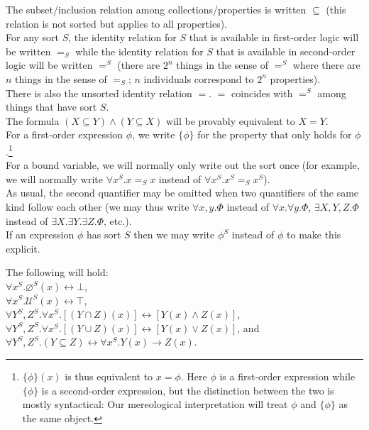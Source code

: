 \documentclass[12pt]{book}
\begin{document}
\indent * The subset/inclusion relation among collections/properties is written $\subseteq$ (this relation is not sorted but applies to all properties).\\
\indent * For any sort $S$, the identity relation for $S$ that is available in first-order logic will be written $=_S$ while the identity relation for $S$ that is available in second-order logic will be written $=^S$ (there are $2^n$ things in the sense of $=^S$ where there are $n$ things in the sense of $=_S$; $n$ individuals correspond to $2^n$ properties).\\
\indent * There is also the unsorted identity relation $=$. $=$ coincides with $=^S$ among things that have sort $S$.\\
\indent * The formula $(X \subseteq Y) \wedge (Y \subseteq X)$ will be provably equivalent to $X = Y$.\\
\indent * For a first-order expression $\phi$, we write $\{\phi\}$ for the property that only holds for $\phi$.\footnote{$\{\phi\}(x)$ is thus equivalent to $x=\phi$. Here $\phi$ is a first-order expression while $\{\phi\}$ is a second-order expression, but the distinction between the two is mostly syntactical: Our mereological interpretation will treat $\phi$ and $\{\phi\}$ as the same object.}\\
\indent * For a bound variable, we will normally only write out the sort once (for example, we will normally write $\forall x^S.x =_S x$ instead of $\forall x^S.x^S =_S x^S$).\\
\indent * As usual, the second quantifier may be omitted when two quantifiers of the same kind follow each other (we may thus write $\forall x,y. \Phi$ instead of $\forall x. \forall y. \Phi$, $\exists X,Y,Z. \Phi$ instead of $\exists X.\exists Y.\exists Z. \Phi$, etc.).\\
\indent * If an expression $\phi$ has sort $S$ then we may write $\phi^S$ instead of $\phi$ to make this explicit.

The following will hold:\\
\indent $\forall x^S.\varnothing^S(x) \leftrightarrow \bot$,\\
\indent $\forall x^S.\mathcal{U}^S(x) \leftrightarrow \top$,\\
\indent $\forall Y^S, Z^S.\forall x^S.[(Y \cap Z)(x)] \leftrightarrow [Y(x) \wedge Z(x)]$,\\
\indent $\forall Y^S, Z^S.\forall x^S.[(Y \cup Z)(x)] \leftrightarrow [Y(x) \vee Z(x)]$, and\\
\indent $\forall Y^S, Z^S.(Y \subseteq Z) \leftrightarrow \forall x^S.Y(x) \rightarrow Z(x)$.
\end{document}
